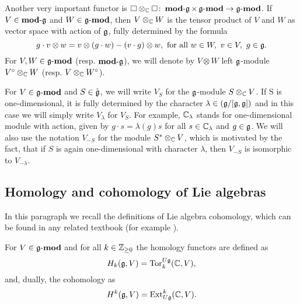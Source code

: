 Another very important functor is $\square \otimes_{\mathbb{C}} \square \colon \operatorname{\mathbf{mod-\mathfrak{g}}} \times
\operatorname{\mathbf{\mathfrak{g}-mod}} \to \operatorname{\mathbf{\mathfrak{g}-mod}}$. If $V \in \operatorname{\mathbf{mod-\mathfrak{g}}}$ and $W \in \operatorname{\mathbf{\mathfrak{g}-mod}}$, then $V \otimes_{\mathbb{C}} W$
is the tensor product of $V$ and $W$ as vector space with action of $\mathfrak{g}$, fully determined by
the formula
\[
    g\cdot v\otimes w = v\otimes (g\cdot w) - (v\cdot g) \otimes w, \text{ for all } w\in W,~v\in
    V,~ g\in \mathfrak{g}.
\]
For $V, W \in \operatorname{\mathbf{\mathfrak{g}-mod}}$ (resp. $\operatorname{\mathbf{mod-\mathfrak{g}}}$), we will denote by $V\otimes W$ left $\mathfrak{g}$-module
$V^\circ \otimes_{\mathbb{C}} W$ (resp. $V \otimes_{\mathbb{C}} W^\circ$).

For $V\in \operatorname{\mathbf{\mathfrak{g}-mod}}$ and $S \in \hat{\mathfrak{g}}$, we will write $V_{S}$ for the $\mathfrak{g}$-module
$S\otimes_{\mathbb{C}} V$.  If S is one-dimensional, it is fully determined by the character $\lambda \in
(\mathfrak{g}/[\mathfrak{g}, \mathfrak{g}])$ and in this case we will simply write $V_\lambda$ for $V_S$. For example,
$\mathbb{C}_\lambda$ stands for one-dimensional module with action, given by $g\cdot s = \lambda(g)s$ for
all $s\in \mathbb{C}_\lambda$ and $g \in \mathfrak{g}$. We will also use the notation $V_{-S}$ for the module
$S^* \otimes_{\mathbb{C}} V$, which is motivated by the fact, that if $S$ is again one-dimensional with
character $\lambda$, then $V_{-S}$ is isomorphic to $V_{-\lambda}$. 

\subsection{Homology and cohomology of Lie algebras}
In this paragraph we recall the definitions of Lie algebra cohomology, which can be found in any
related textbook (for example \cite{weibel}).


\begin{definition}
    For $V\in \operatorname{\mathbf{\mathfrak{g}-mod}}$ and for all $k\in \mathbb{Z}_{\geq0}$ the homology functors are defined as 
    \begin{equation}
        H_k(\mathfrak{g}, V) = \mathrm{Tor}_k^{U\mathfrak{g}}(\mathbb{C}, V),
    \end{equation}
    and, dually, the cohomology as
    \begin{equation}
        H^k(\mathfrak{g}, V) = \operatorname{Ext}^k_{U\mathfrak{g}}(\mathbb{C}, V).
    \end{equation}
\end{definition}

